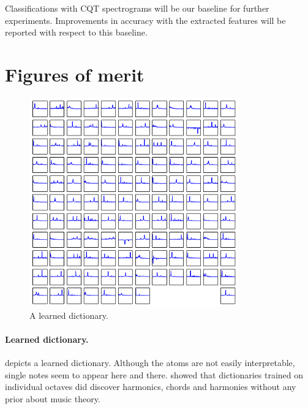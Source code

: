 Classifications with \gls{CQT} spectrograms will be our baseline for further experiments. Improvements in accuracy with the extracted features will be reported with respect to this baseline.


\section{Figures of merit}

\begin{figure}[ht]
	\centering
	\includegraphics[width=9cm]{img/dictionary}
	\caption[]{A learned dictionary.}
	\label{fig:dictionary}
\end{figure}

\paragraph{Learned dictionary.}
 depicts a learned dictionary. Although the atoms are not easily interpretable, single notes seem to appear here and there. \cite{lecun2010PSD} showed that dictionaries trained on individual octaves did discover harmonics, chords and harmonies without any prior about music theory.

